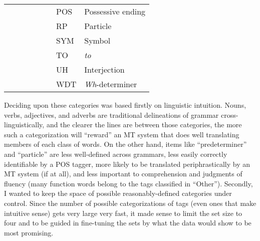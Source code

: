 \documentclass[paper=a4, fontsize=11pt]{scrartcl}
\numberwithin{equation}{section}		%
\numberwithin{figure}{section}			%
\numberwithin{table}{section}				%
\begin{document}
\begin{table}[htbp]
{\begin{tabular}{@{}llllllll@{}}
    & \multicolumn{1}{l|}{}                       &       & \multicolumn{1}{l|}{}                       &     & \multicolumn{1}{l|}{}                            & POS & Possessive ending         \\
    & \multicolumn{1}{l|}{}                       &       & \multicolumn{1}{l|}{}                       &     & \multicolumn{1}{l|}{}                            & RP  & Particle                  \\
    & \multicolumn{1}{l|}{}                       &       & \multicolumn{1}{l|}{}                       &     & \multicolumn{1}{l|}{}                            & SYM & Symbol                    \\
    & \multicolumn{1}{l|}{}                       &       & \multicolumn{1}{l|}{}                       &     & \multicolumn{1}{l|}{}                            & TO  & \textit{to}                        \\
    & \multicolumn{1}{l|}{}                       &       & \multicolumn{1}{l|}{}                       &     & \multicolumn{1}{l|}{}                            & UH  & Interjection              \\
    & \multicolumn{1}{l|}{}                       &       & \multicolumn{1}{l|}{}                       &     & \multicolumn{1}{l|}{}                            & WDT & \textit{Wh}-determiner             \\ \bottomrule
\end{tabular}}
\end{table}

Deciding upon these categories was based firstly on linguistic intuition.  Nouns, verbs, adjectives, and adverbs are traditional delineations of grammar cross-linguistically, and the clearer the lines are between those categories, the more such a categorization will ``reward'' an MT system that does well translating members of each class of words.  On the other hand, items like ``predeterminer'' and ``particle'' are less well-defined across grammars, less easily correctly identifiable by a POS tagger, more likely to be translated periphrastically by an MT system (if at all), and less important to comprehension and judgments of fluency (many function words belong to the tags classified in ``Other'').  Secondly, I wanted to keep the space of possible reasonably-defined categories under control.  Since the number of possible categorizations of tags (even ones that make intuitive sense) gets very large very fast, it made sense to limit the set size to four and to be guided in fine-tuning the sets by what the data would show to be most promising.
\end{document}
